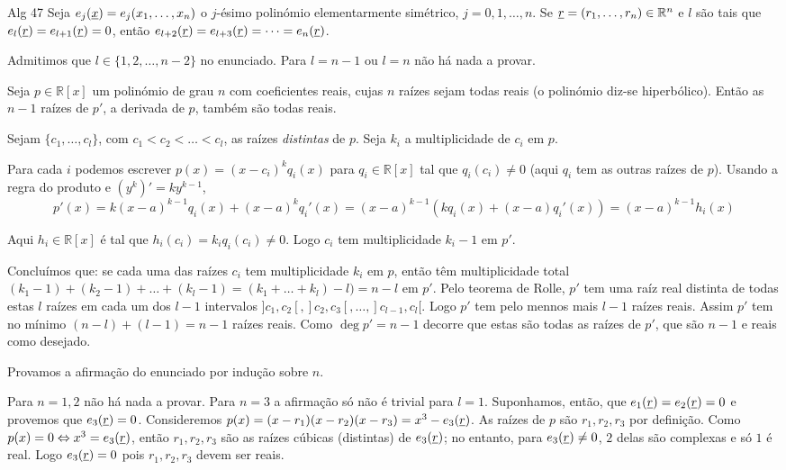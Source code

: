 \documentclass[repertorio-solutions-1.tex]{subfiles}
\renewcommand*{\u}[1]{\ensuremath{\uline{#1}}}
\begin{document}
\begin{problem}{Alg 47}
Seja $e_j(\u{x})=e_j(x_1,\dots,x_n)$ o $j$-ésimo polinómio elementarmente
simétrico, $j=0,1,\dots,n$.
Se $\u{r}=(r_1,\dots,r_n)\in\mathbb{R}^n$ e $l$ são tais que
$e_l(\u{r})=e_{l+1}(\u{r})=0$, então
$e_{l+2}(\u{r})=e_{l+3}(\u{r})=\dots=e_n(\u{r})$.
\end{problem}

\begin{solution}
Admitimos que $l\in\{1,2,\dots,n-2\}$ no enunciado.
Para $l=n-1$ ou $l=n$ não há nada a provar.

\begin{lemma}
Seja $p\in\mathbb{R}[x]$ um polinómio de grau $n$ com coeficientes reais,
cujas $n$ raízes sejam todas reais (o polinómio diz-se hiperbólico).
Então as $n-1$ raízes de $p'$, a derivada de $p$, também são todas reais.

\begin{quickproof}
Sejam $\{c_1,\dots,c_l\}$, com $c_1<c_2<\dots<c_l$,
as raízes \emph{distintas} de $p$.
Seja $k_i$ a multiplicidade de $c_i$ em $p$.

Para cada $i$ podemos escrever $p(x)=(x-c_i)^k q_i(x)$
para $q_i\in\mathbb{R}[x]$ tal que $q_i(c_i)\neq 0$
(aqui $q_i$ tem as outras raízes de $p$).
Usando a regra do produto e $(y^k)'=ky^{k-1}$,
\begin{equation*}
p'(x)=k(x-a)^{k-1} q_i(x)+(x-a)^kq_i'(x)
=(x-a)^{k-1}(kq_i(x)+(x-a)q_i'(x))
=(x-a)^{k-1}h_i(x)
\end{equation*}

Aqui $h_i\in\mathbb{R}[x]$ é tal que $h_i(c_i)=k_iq_i(c_i)\neq 0$.
Logo $c_i$ tem multiplicidade $k_i-1$ em $p'$.

Concluímos que: se cada uma das raízes $c_i$ tem multiplicidade $k_i$ em $p$,
então têm multiplicidade total
$(k_1-1)+(k_2-1)+\dots+(k_l-1)=(k_1+\dots+k_l)-l)=n-l$ em $p'$.
Pelo teorema de Rolle, $p'$ tem uma raíz real distinta de todas estas $l$
raízes em cada um dos $l-1$ intervalos $]c_1,c_2[,]c_2,c_3[,\dots,]c_{l-1},c_l[$.
Logo $p'$ tem pelo mennos mais $l-1$ raízes reais.
Assim $p'$ tem no mínimo $(n-l)+(l-1)=n-1$ raízes reais.
Como $\deg p'=n-1$ decorre que estas são todas as raízes de $p'$,
que são $n-1$ e reais como desejado.
\end{quickproof}
\end{lemma}

Provamos a afirmação do enunciado por indução sobre $n$.

Para $n=1,2$ não há nada a provar.
Para $n=3$ a afirmação só não é trivial para $l=1$.
Suponhamos, então, que $e_1(\u{r})=e_2(\u{r})=0$ e provemos que $e_3(\u{r})=0$.
Consideremos $p(x)=(x-r_1)(x-r_2)(x-r_3)=x^3-e_3(\u{r})$.
As raízes de $p$ são $r_1,r_2,r_3$ por definição.
Como $p(x)=0\Leftrightarrow x^3=e_3(\u{r})$,
então $r_1,r_2,r_3$ são as raízes cúbicas (distintas) de $e_3(\u{r})$;
no entanto, para $e_3(\u{r})\neq 0$, $2$ delas são complexas e só $1$ é real.
Logo $e_3(\u{r})=0$ pois $r_1,r_2,r_3$ devem ser reais.


\end{solution}
\end{document}
